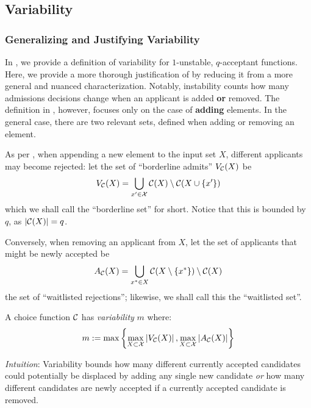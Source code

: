 \subsection{Variability} \label{sec:variability-appendix}

\subsubsection{Generalizing and Justifying Variability}

In , we provide a definition of variability for $1$-unstable, $q$-acceptant functions. Here, we provide a more thorough justification of  by reducing it from a more general and nuanced characterization.
Notably, instability counts how many admissions decisions change when an applicant is added \textbf{or} removed. The definition in , however, focuses only on the case of \textbf{adding} elements. In the general case, there are two relevant sets, defined when adding or removing an element.

As per , when appending a new element to the input set $X$, different applicants may become rejected: let the set of ``borderline admits'' $V_{\mathcal{C}}(X)$ be
\begin{equation}
V_{\mathcal{C}}(X) = \bigcup\limits_{x'\in\mathcal{X}} \mathcal{C}(X) \setminus \mathcal{C}(X \cup \{x'\})
\end{equation}
which we shall call the ``borderline set'' for short. Notice that this is bounded by $q$, as $|\mathcal{C}(X)| = q$.

Conversely, when removing an applicant from $X$, let the set of applicants that might be newly accepted be
\begin{equation}
A_{\mathcal{C}}(X) = \bigcup_{x^*\in X} \mathcal{C}(X \setminus \{x^*\}) \setminus \mathcal{C}(X)
\end{equation}
the set of ``waitlisted rejections''; likewise, we shall call this the ``waitlisted set''.

\begin{definition}
\label{def:variability-general}
A choice function $\mathcal{C}$ has \textit{variability} $m$ where:
$$m := \max\left\{\max_{X\subset \mathcal{X}} \left|V_{\mathcal{C}}(X)\right|, \max_{X\subset \mathcal{X}} \left|A_{\mathcal{C}}(X)\right| \right\}$$
\end{definition}

\textit{Intuition}: Variability bounds how many different currently accepted candidates could potentially be displaced by adding any single new candidate \textit{or} how many different candidates are newly accepted if a currently accepted candidate is removed.%

